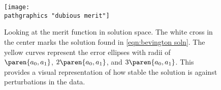 \begin{figure}[t]
	\texttt{[image: \\pathgraphics "dubious merit"]}
	\caption{Looking at the merit function in solution space. The white cross in the center marks the solution found in \eqref{eqn:bevington soln}. The yellow curves represent the error ellipses with radii of $\paren{a_{0},a_{1}}$, $2\paren{a_{0},a_{1}}$, and $3\paren{a_{0},a_{1}}$. This provides a visual representation of how stable the solution is against perturbations in the data.}
	\label{fig:dubious merit}
\end{figure}

\endinput  %